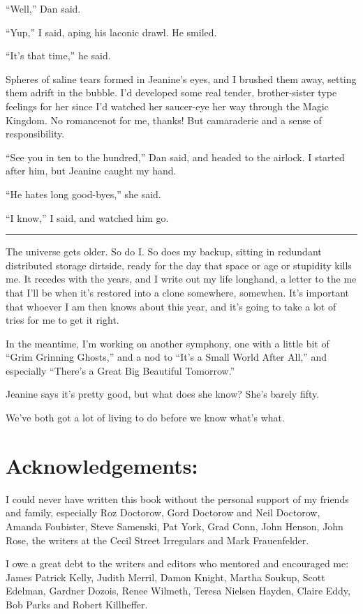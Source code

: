 “Well,” Dan said.

“Yup,” I said, aping his laconic drawl. He smiled.

“It's that time,” he said.

Spheres of saline tears formed in Jeanine's eyes, and I brushed
them away, setting them adrift in the bubble. I'd developed some
real tender, brother-sister type feelings for her since I'd watched
her saucer-eye her way through the Magic Kingdom. No romance{\dash}not
for me, thanks! But camaraderie and a sense of responsibility.

“See you in ten to the hundred,” Dan said, and headed to the
airlock. I started after him, but Jeanine caught my hand.

“He hates long good-byes,” she said.

“I know,” I said, and watched him go.

\begin{center}\rule{3in}{0.4pt}\end{center}

The universe gets older. So do I. So does my backup, sitting in
redundant distributed storage dirtside, ready for the day that
space or age or stupidity kills me. It recedes with the years, and
I write out my life longhand, a letter to the me that I'll be when
it's restored into a clone somewhere, somewhen. It's important that
whoever I am then knows about this year, and it's going to take a
lot of tries for me to get it right.

In the meantime, I'm working on another symphony, one with a little
bit of “Grim Grinning Ghosts,” and a nod to “It's a Small World
After All,” and especially “There's a Great Big Beautiful
Tomorrow.”

Jeanine says it's pretty good, but what does she know? She's barely
fifty.

We've both got a lot of living to do before we know what's what.

\section{Acknowledgements:}

I could never have written this book without the personal support
of my friends and family, especially Roz Doctorow, Gord Doctorow
and Neil Doctorow, Amanda Foubister, Steve Samenski, Pat York, Grad
Conn, John Henson, John Rose, the writers at the Cecil Street
Irregulars and Mark Frauenfelder.

I owe a great debt to the writers and editors who mentored and
encouraged me: James Patrick Kelly, Judith Merril, Damon Knight,
Martha Soukup, Scott Edelman, Gardner Dozois, Renee Wilmeth, Teresa
Nielsen Hayden, Claire Eddy, Bob Parks and Robert Killheffer.

